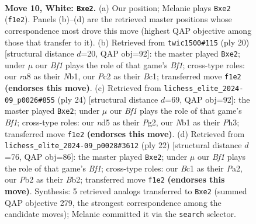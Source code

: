 \documentclass[11pt]{article}
\begin{document}
\clearpage

\begin{figure}[p]\centering
\begin{subfigure}{0.46\textwidth}\centering
\resizebox{\linewidth}{!}{%
\newchessgame
\chessboard[
  setfen={r1b1kb1r/p1p2ppp/2pP4/3n4/8/5P2/PPP1q1PP/RNB1KB1R w KQkq - 0 10},
  showmover=false,
  pgfstyle=straightmove, color=movearrow, markmove={f1-e2}
]}
\caption{}
\end{subfigure}\hfill
\begin{subfigure}{0.46\textwidth}\centering
\resizebox{\linewidth}{!}{%
\newchessgame
\chessboard[
  setfen={r1b1kb1r/p1p2ppp/1npP4/8/2P4P/8/PP2qPP1/RNB1KB1R w KQkq - 0 11},
  showmover=false,
  pgfstyle=straightmove, color=movearrow, markmove={f1-e2}
]}
\caption{}
\end{subfigure}
\\[4pt]
\begin{subfigure}{0.46\textwidth}\centering
\resizebox{\linewidth}{!}{%
\newchessgame
\chessboard[
  setfen={r3k1nr/ppp2ppp/2nb4/3N4/2P5/7P/PP2qPP1/R1B1KB1R w KQkq - 0 13},
  showmover=false,
  pgfstyle=straightmove, color=movearrow, markmove={f1-e2}
]}
\caption{}
\end{subfigure}\hfill
\begin{subfigure}{0.46\textwidth}\centering
\resizebox{\linewidth}{!}{%
\newchessgame
\chessboard[
  setfen={rn2kbnr/pp3ppp/4p3/2P5/1P6/2P4P/PB1Nq2P/R3KB1R w KQkq - 0 12},
  showmover=false,
  pgfstyle=straightmove, color=movearrow, markmove={f1-e2}
]}
\caption{}
\end{subfigure}
\caption{\textbf{Move 10, White: \texttt{Bxe2}.} (a) Our position; Melanie plays \texttt{Bxe2} (\texttt{f1e2}). Panels (b)--(d) are the retrieved master positions whose correspondence most drove this move (highest QAP objective among those that transfer to it). (b) Retrieved from \texttt{twic1500\#115} (ply 20) [structural distance $d$=20, QAP obj=92]: the master played \texttt{Bxe2}; under $\mu$ our \emph{Bf1} plays the role of that game's \emph{Bf1}; cross-type roles: our \emph{r}a8 as their \emph{N}b1, our \emph{P}c2 as their \emph{B}c1; transferred move \texttt{f1e2} \textbf{(endorses this move)}. (c) Retrieved from \texttt{lichess\_elite\_2024-09\_p0026\#855} (ply 24) [structural distance $d$=69, QAP obj=92]: the master played \texttt{Bxe2}; under $\mu$ our \emph{Bf1} plays the role of that game's \emph{Bf1}; cross-type roles: our \emph{n}d5 as their \emph{P}g2, our \emph{N}b1 as their \emph{P}h3; transferred move \texttt{f1e2} \textbf{(endorses this move)}. (d) Retrieved from \texttt{lichess\_elite\_2024-09\_p0028\#3612} (ply 22) [structural distance $d$=76, QAP obj=86]: the master played \texttt{Bxe2}; under $\mu$ our \emph{Bf1} plays the role of that game's \emph{Bf1}; cross-type roles: our \emph{B}c1 as their \emph{P}a2, our \emph{P}b2 as their \emph{B}b2; transferred move \texttt{f1e2} \textbf{(endorses this move)}. Synthesis: 5 retrieved analogs transferred to \texttt{Bxe2} (summed QAP objective 279, the strongest correspondence among the candidate moves); Melanie committed it via the \texttt{search} selector.}
\label{fig:thought-m18}
\end{figure}
\end{document}
